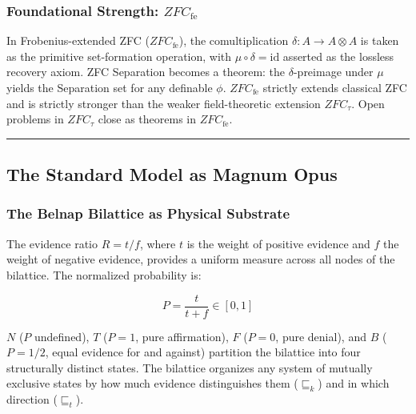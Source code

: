 \documentclass[12pt,a4paper]{article}
\begin{document}
\hypertarget{foundational-strength-zfc_textfe}{%
\subsubsection{\texorpdfstring{Foundational Strength:
\(ZFC_\text{fe}\)}{Foundational Strength: ZFC\_\textbackslash text\{fe\}}}\label{foundational-strength-zfc_textfe}}

In Frobenius-extended ZFC (\(ZFC_\text{fe}\)), the comultiplication
\(\delta: A \to A \otimes A\) is taken as the primitive set-formation
operation, with \(\mu \circ \delta = \mathrm{id}\) asserted as the
lossless recovery axiom. ZFC Separation becomes a theorem: the
\(\delta\)-preimage under \(\mu\) yields the Separation set for any
definable \(\phi\). \(ZFC_\text{fe}\) strictly extends classical ZFC and
is strictly stronger than the weaker field-theoretic extension
\(ZFC_\tau\). Open problems in \(ZFC_\tau\) close as theorems in
\(ZFC_\text{fe}\).

\begin{center}\rule{0.5\linewidth}{0.5pt}\end{center}

\hypertarget{the-standard-model-as-magnum-opus}{%
\subsection{The Standard Model as Magnum
Opus}\label{the-standard-model-as-magnum-opus}}

\hypertarget{the-belnap-bilattice-as-physical-substrate}{%
\subsubsection{The Belnap Bilattice as Physical
Substrate}\label{the-belnap-bilattice-as-physical-substrate}}

The evidence ratio \(R = t/f\), where \(t\) is the weight of positive
evidence and \(f\) the weight of negative evidence, provides a uniform
measure across all nodes of the bilattice. The normalized probability
is:

\[P = \frac{t}{t + f} \in [0, 1]\]

\(N\) (\(P\) undefined), \(T\) (\(P = 1\), pure affirmation), \(F\)
(\(P = 0\), pure denial), and \(B\) (\(P = 1/2\), equal evidence for and
against) partition the bilattice into four structurally distinct states.
The bilattice organizes any system of mutually exclusive states by how
much evidence distinguishes them (\(\sqsubseteq_k\)) and in which
direction (\(\sqsubseteq_t\)).
\end{document}
